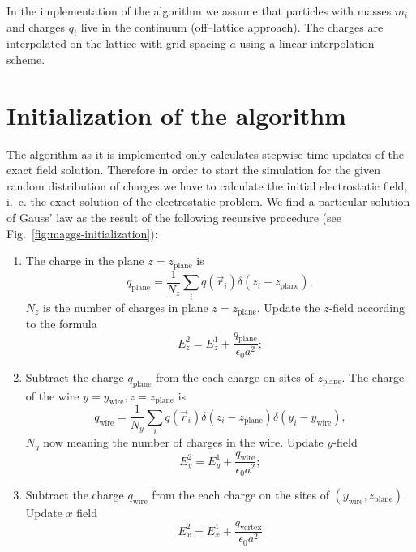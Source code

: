 In the implementation of the algorithm we assume that particles with
masses $m_i$ and charges $q_i$ live in the continuum (off--lattice
approach). The charges are interpolated on the lattice with grid
spacing $a$ using a linear interpolation scheme.

\section{Initialization of the algorithm}

The algorithm as it is implemented only calculates stepwise time
updates of the exact field solution. Therefore in order to start the
simulation for the given random distribution of charges we have to
calculate the initial electrostatic field, i.~e. the exact solution of
the electrostatic problem. We find a particular solution of Gauss' law
as the result of the following recursive procedure (see
Fig.~\ref{fig:maggs-initialization}):

\begin{enumerate}
\item The charge in the plane $z=z_\text{plane}$ is
\begin{equation}
  q_\text{plane}=\frac{1}{N_z}\sum_iq(\vec r_i)\delta(z_i-z_\text{plane}),
\end{equation}
$N_z$ is the number of charges in plane $z=z_\text{plane}$. Update the
$z$-field according to the formula
\begin{equation}
  E_z^2=E_z^1+\frac{q_\text{plane}}{\epsilon_0a^2};
\end{equation}
\item Subtract the charge $q_\text{plane}$ from the each charge on
  sites of $z_\text{plane}$. The charge of the wire $y=y_\text{wire},
  z=z_\text{plane}$ is
\begin{equation}
  q_\text{wire}=\frac{1}{N_y}\sum_iq(\vec r_i)\delta(z_i-z_\text{plane})\delta(y_i-y_\text{wire}),
\end{equation}
$N_y$ now meaning the number of charges in the wire. Update $y$-field
\begin{equation}
  E_y^2=E_y^1+\frac{q_\text{wire}}{\epsilon_0a^2};
\end{equation}
\item Subtract the charge $q_\text{wire}$ from the each charge on the
  sites of $(y_\text{wire},z_\text{plane})$. Update $x$ field
\begin{equation}
  E_x^2=E_x^1+\frac{q_\text{vertex}}{\epsilon_0a^2}
\end{equation}
\end{enumerate}

